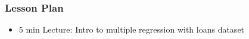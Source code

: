 \begin{frame}
    \frametitle{Lesson Plan}
    \begin{itemize}
        \item 5 min Lecture: Intro to multiple regression with loans dataset
    \end{itemize}
\end{frame}

